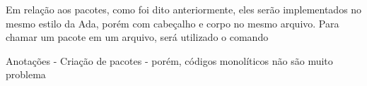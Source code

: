 Em relação aos pacotes, como foi dito anteriormente, eles serão implementados
no mesmo estilo da Ada, porém com cabeçalho e corpo no mesmo arquivo. Para
chamar um pacote em um arquivo, será utilizado o comando 

Anotações
- Criação de pacotes - porém, códigos monolíticos não são muito problema
